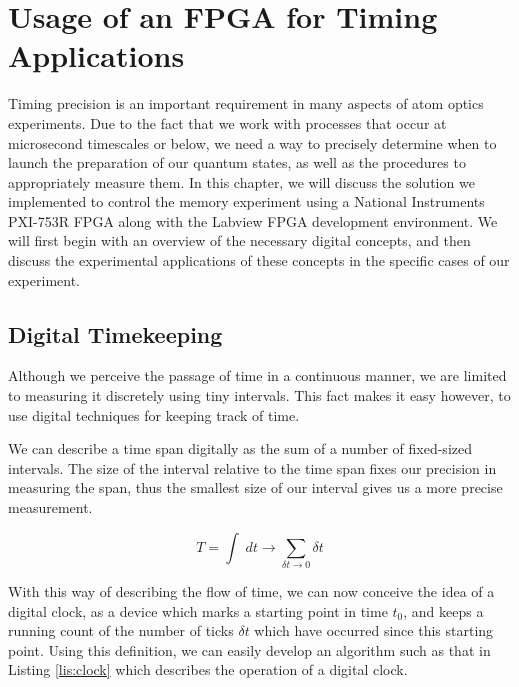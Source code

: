 \chapter{Usage of an FPGA for Timing Applications}
\label{ch:7} 
\minitoc


Timing precision is an important requirement in many aspects of atom optics experiments.  Due to the fact that we work with processes that occur at microsecond timescales or below, we need a way to precisely determine when to launch the preparation of our quantum states, as well as the procedures to appropriately measure them.  In this chapter, we will discuss the solution we implemented to control the memory experiment using a National Instruments PXI-753R FPGA along with the Labview FPGA development environment.  We will first begin with an overview of the necessary digital concepts, and then discuss the experimental applications of these concepts in the specific cases of our experiment.


\section{Digital Timekeeping}

Although we perceive the passage of time in a continuous manner, we are
limited to measuring it discretely using tiny intervals.  This fact makes it
easy however, to use digital techniques for keeping track of time. 

We can describe a time span digitally as the sum of a number of fixed-sized intervals.  The size of the interval relative to the time span fixes our precision in measuring the span, thus the smallest size of our interval gives us a more precise measurement.

\begin{equation}
  \label{eq:time_definition}
  T = \int \; dt \to \sum_{\delta t \to 0} \delta t
\end{equation}

With this way of describing the flow of time, we can now conceive the idea of a digital clock, as a device which marks a starting point in time $t_0$, and keeps a running count of the number of ticks $\delta t$ which have occurred since this starting point.  Using this definition, we can easily develop an algorithm such as that in
Listing \ref{lis:clock} which describes the operation of a digital clock.


\lstset{
  language=Pascal,
  numbers=left,
  basicstyle=\small,
  stringstyle=\ttfamily,
  showstringspaces=false,
  captionpos=b
}
 
